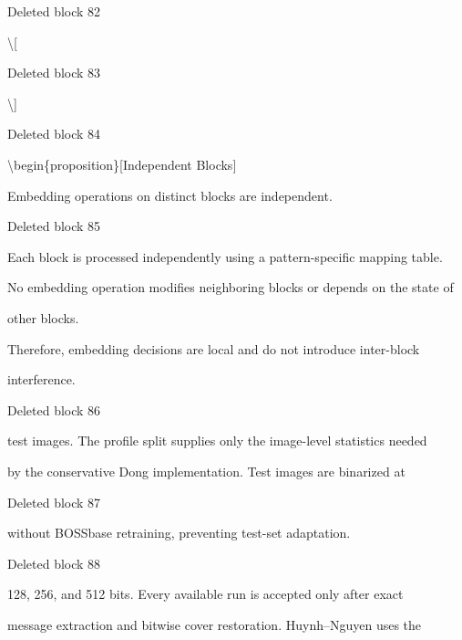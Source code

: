 \documentclass[a4paper,fleqn]{cas-dc}
\newenvironment{RevisionDeletion}{%
  \par\begingroup\color{revisionred}\footnotesize\ttfamily
  \setlength{\parindent}{0pt}\setlength{\parskip}{1pt}\obeyspaces
}{\par\endgroup}
\begin{document}
\begin{RevisionDeletion}
Deleted block 82\par
\textbackslash{}[\par
\end{RevisionDeletion}

\begin{RevisionDeletion}
Deleted block 83\par
\textbackslash{}]\par
\end{RevisionDeletion}

\begin{RevisionDeletion}
Deleted block 84\par
\textbackslash{}begin\{proposition\}[Independent Blocks]\par
Embedding operations on distinct blocks are independent.\par
\end{RevisionDeletion}

\begin{RevisionDeletion}
Deleted block 85\par
Each block is processed independently using a pattern-specific mapping table.\par
No embedding operation modifies neighboring blocks or depends on the state of\par
other blocks.\par
Therefore, embedding decisions are local and do not introduce inter-block\par
interference.\par
\end{RevisionDeletion}

\begin{RevisionDeletion}
Deleted block 86\par
test images. The profile split supplies only the image-level statistics needed\par
by the conservative Dong implementation. Test images are binarized at\par
\end{RevisionDeletion}

\begin{RevisionDeletion}
Deleted block 87\par
without BOSSbase retraining, preventing test-set adaptation.\par
\end{RevisionDeletion}

\begin{RevisionDeletion}
Deleted block 88\par
128, 256, and 512 bits. Every available run is accepted only after exact\par
message extraction and bitwise cover restoration. Huynh--Nguyen uses the\par
\end{RevisionDeletion}
\end{document}
